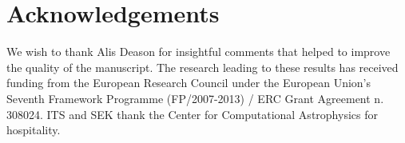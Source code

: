 \documentclass[fleqn,usenatbib]{mnras}
\begin{document}
\section*{Acknowledgements}

We wish to thank Alis Deason for insightful comments that
helped to improve the quality of the manuscript.  The research leading
to these results has received funding from the European Research
Council under the European Union's Seventh Framework Programme
(FP/2007-2013) / ERC Grant Agreement n. 308024. ITS and SEK thank the
Center for Computational Astrophysics for hospitality.





\bsp	%
\label{lastpage}
\end{document}
